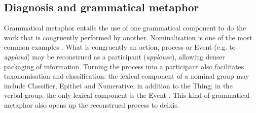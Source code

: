 \documentclass{article}
\renewcommand{\cite}{\parencite}
\begin{document}
\subsection{Diagnosis and grammatical metaphor}

Grammatical metaphor entails the use of one grammatical component to do the work that is congruently performed by another. Nominalisation is one of the most common examples \cite{simon-vandenbergen_grammatical_2003}. What is congruently an action, process or Event (e.g. to \emph{applaud}) may be reconstrued as a participant (\emph{applause}), allowing denser packaging of information. Turning the process into a participant also facilitates taxonomisation and classification: the lexical component of a nominal group may include Classifier, Epithet and Numerative, in addition to the Thing; in the verbal group, the only lexical component is the Event \cite{halliday_introduction_2004}. This kind of grammatical metaphor also opens up the reconstrued process to deixis.
\end{document}
